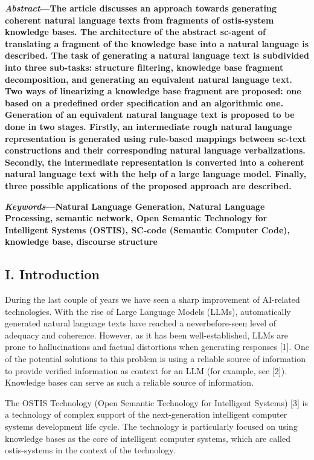 \documentclass[9pt, a4paper]{article}
\begin{document}
\begin{minipage}{0.47\textwidth}
\parindent 2mm
\textbf{\textit{Abstract}—The article discusses an approach towards generating coherent natural language texts from fragments of ostis-system knowledge bases. The architecture of the abstract sc-agent of translating a fragment of the knowledge
base into a natural language is described. The task of
generating a natural language text is subdivided into three
sub-tasks: structure filtering, knowledge base fragment decomposition, and generating an equivalent natural language
text. Two ways of linearizing a knowledge base fragment are
proposed: one based on a predefined order specification and
an algorithmic one. Generation of an equivalent natural
language text is proposed to be done in two stages. Firstly,
an intermediate rough natural language representation
is generated using rule-based mappings between sc-text
constructions and their corresponding natural language
verbalizations. Secondly, the intermediate representation
is converted into a coherent natural language text with
the help of a large language model. Finally, three possible
applications of the proposed approach are described.}


\textbf{\textit{Keywords}—Natural Language Generation, Natural Language Processing, semantic network, Open Semantic Technology for Intelligent Systems (OSTIS), SC-code (Semantic
Computer Code), knowledge base, discourse structure}

\begin{center}
  \section*{\small{I. Introduction}}
\end{center}

During the last couple of years we have seen a
sharp improvement of AI-related technologies. With the
rise of Large Language Models (LLMs), automatically
generated natural language texts have reached a neverbefore-seen level of adequacy and coherence. However,
as it has been well-established, LLMs are prone to
hallucinations and factual distortions when generating
responses [1]. One of the potential solutions to this
problem is using a reliable source of information to
provide verified information as context for an LLM (for
example, see [2]). Knowledge bases can serve as such a
reliable source of information.


The OSTIS Technology (Open Semantic Technology
for Intelligent Systems) [3] is a technology of complex
support of the next-generation intelligent computer systems development life cycle. The technology is particularly focused on using knowledge bases as the core
of intelligent computer systems, which are called ostis-systems in the context of the technology.
\end{minipage}
\end{document}

